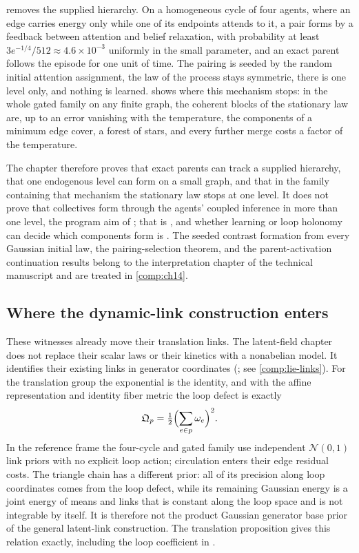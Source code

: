  removes the supplied hierarchy. On a homogeneous cycle of four
agents, where an edge carries energy only while one of its endpoints attends to it, a pair forms by a
feedback between attention and belief relaxation, with probability at least
\(3e^{-1/4}/512\approx4.6\times10^{-3}\) uniformly in the small parameter, and an exact parent follows
the episode for one unit of time. The pairing is seeded by the random initial attention assignment, the
law of the process stays symmetric, there is one level only, and nothing is learned.
 shows where this mechanism stops: in the whole gated family on any finite
graph, the coherent blocks of the stationary law are, up to an error vanishing with the temperature, the
components of a minimum edge cover, a forest of stars, and every further merge costs a factor of the
temperature.

The chapter therefore proves that exact parents can track a supplied hierarchy, that one endogenous
level can form on a small graph, and that in the family containing that mechanism the stationary law
stops at one level. It does not prove that collectives form through the agents' coupled inference in
more than one level, the program aim of ; that is
, and whether learning or loop holonomy can decide which components form
is . The seeded contrast formation from every Gaussian initial
law, the pairing-selection theorem, and the parent-activation continuation results belong to the
interpretation chapter of the technical manuscript and are treated in \cref{comp:ch14}.

\subsection{Where the dynamic-link construction enters}

These witnesses already move their translation links. The latent-field chapter does not replace
their scalar laws or their kinetics with a nonabelian model. It identifies their existing links in
generator coordinates (; see \cref{comp:lie-links}). For the
translation group the exponential is the identity, and with the affine representation and identity
fiber metric the loop defect is exactly
\[
\mathfrak Q_p=\tfrac12\Bigl(\sum_{e\in p}\omega_e\Bigr)^2.
\]
In the reference frame the four-cycle and gated family use independent $\mathcal N(0,1)$ link
priors with no explicit loop action; circulation enters their edge residual costs. The triangle
chain has a different prior: all of its precision along loop coordinates comes from the loop
defect, while its remaining Gaussian energy is a joint energy of means and links that is constant
along the loop space and is not integrable by itself. It is therefore not the product Gaussian
generator base prior of the general latent-link construction. The translation proposition gives
this relation exactly, including the loop coefficient in .

